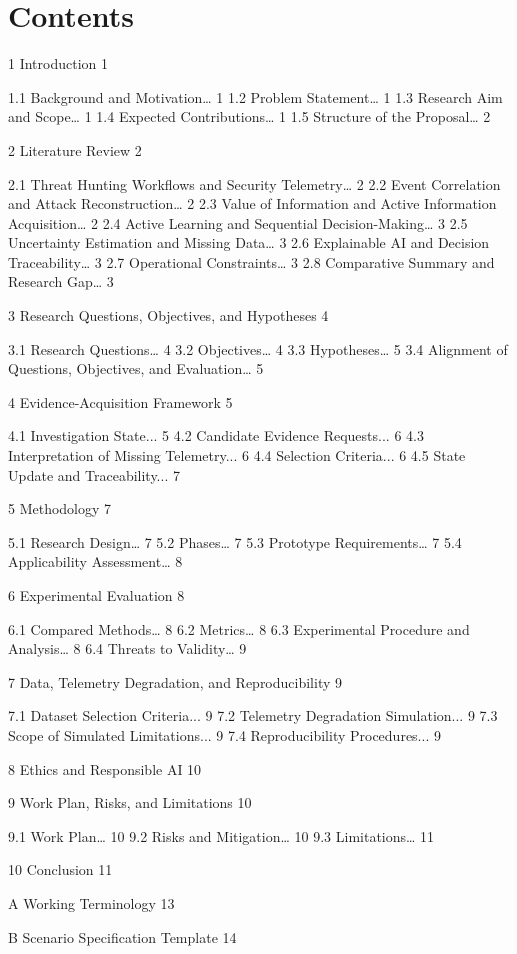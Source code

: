 \documentclass[a4paper,11pt]{article}
\begin{document}
\section*{Contents}
1 Introduction 1\par
1.1 Background and Motivation… 1 1.2 Problem Statement… 1 1.3 Research Aim and Scope… 1 1.4 Expected Contributions… 1 1.5 Structure of the Proposal… 2\par
2 Literature Review 2\par
2.1 Threat Hunting Workflows and Security Telemetry… 2 2.2 Event Correlation and Attack Reconstruction… 2 2.3 Value of Information and Active Information Acquisition… 2 2.4 Active Learning and Sequential Decision-Making… 3 2.5 Uncertainty Estimation and Missing Data… 3 2.6 Explainable AI and Decision Traceability… 3 2.7 Operational Constraints… 3 2.8 Comparative Summary and Research Gap… 3\par
3 Research Questions, Objectives, and Hypotheses 4\par
3.1 Research Questions… 4 3.2 Objectives… 4 3.3 Hypotheses… 5 3.4 Alignment of Questions, Objectives, and Evaluation… 5\par
4 Evidence-Acquisition Framework 5\par
4.1 Investigation State... 5 4.2 Candidate Evidence Requests... 6 4.3 Interpretation of Missing Telemetry... 6 4.4 Selection Criteria... 6 4.5 State Update and Traceability... 7\par
5 Methodology 7\par
5.1 Research Design… 7 5.2 Phases… 7 5.3 Prototype Requirements… 7 5.4 Applicability Assessment… 8\par
6 Experimental Evaluation 8\par
6.1 Compared Methods… 8 6.2 Metrics… 8 6.3 Experimental Procedure and Analysis… 8 6.4 Threats to Validity… 9\par
7 Data, Telemetry Degradation, and Reproducibility 9\par
7.1 Dataset Selection Criteria... 9 7.2 Telemetry Degradation Simulation... 9 7.3 Scope of Simulated Limitations... 9 7.4 Reproducibility Procedures... 9\par
8 Ethics and Responsible AI 10\par
9 Work Plan, Risks, and Limitations 10\par
9.1 Work Plan… 10 9.2 Risks and Mitigation… 10 9.3 Limitations… 11\par
10 Conclusion 11\par
A Working Terminology 13\par
B Scenario Specification Template 14\par
\newpage
\end{document}
